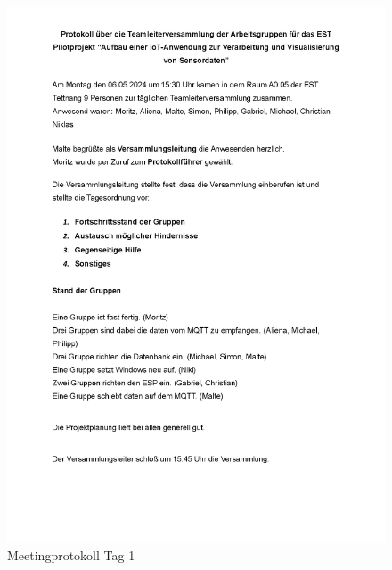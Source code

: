 \begin{figure}[h]
	\centering
	\includegraphics[width=14.5cm]{images/Protokoll1.png}
	\caption{Meetingprotokoll Tag 1}
	\label{fig:protokoll1}
\end{figure}


